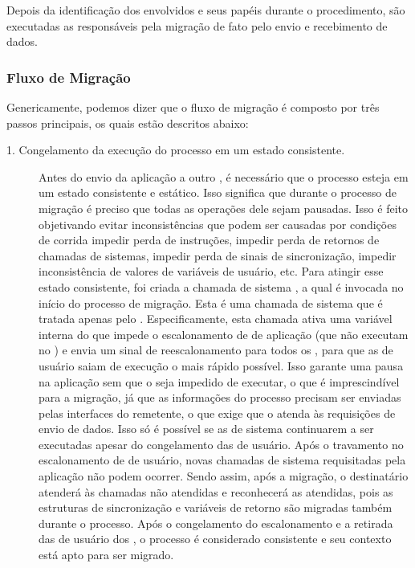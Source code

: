 Depois da identificação dos \clusters envolvidos e seus papéis durante o procedimento, são executadas as \tasks responsáveis pela migração de fato \ie pelo envio e recebimento de dados.


\subsubsection{Fluxo de Migração}\label{sec.fluxo-migracao}

Genericamente, podemos dizer que o fluxo de migração é composto por três passos principais, os quais estão descritos abaixo:
\begin{description}
	\item[1. Congelamento da execução do processo em um estado consistente.] \hfill
	
    Antes do envio da aplicação a outro \cluster, é necessário que o processo esteja em um estado consistente e estático. Isso significa que durante o processo de migração é preciso que todas as operações dele sejam pausadas. Isso é feito objetivando evitar inconsistências que podem ser causadas por condições de corrida \eg impedir perda de instruções, impedir perda de retornos de chamadas de sistemas, impedir perda de sinais de sincronização, impedir inconsistência de valores de variáveis de usuário, etc. 
    Para atingir esse estado consistente, foi criada a chamada de sistema \freeze, a qual é invocada no início do processo de migração. Esta é uma chamada de sistema que é tratada apenas pelo \mcore. Especificamente, esta chamada ativa uma variável interna do \so que impede o escalonamento de \threads de aplicação (\threads que não executam no \mcore) e envia um sinal de reescalonamento para todos os \scores, para que as \threads de usuário saiam de execução o mais rápido possível. Isso garante uma pausa na aplicação sem que o \so seja impedido de executar, o que é imprescindível para a migração, já que as informações do processo precisam ser enviadas pelas interfaces \noc do \cluster remetente, o que exige que o \so atenda às requisições de envio de dados. Isso só é possível se as \threads de sistema continuarem a ser executadas apesar do congelamento das de usuário.
    Após o travamento no escalonamento de \threads de usuário, novas chamadas de sistema requisitadas pela aplicação não podem ocorrer. Sendo assim, após a migração, o \cluster destinatário atenderá às chamadas não atendidas e reconhecerá as atendidas, pois as estruturas de sincronização e variáveis de retorno são migradas também durante o processo. Após o congelamento do escalonamento e a retirada das \threads de usuário dos \scores, o processo é considerado consistente e seu contexto está apto para ser migrado.
    

\end{description}
